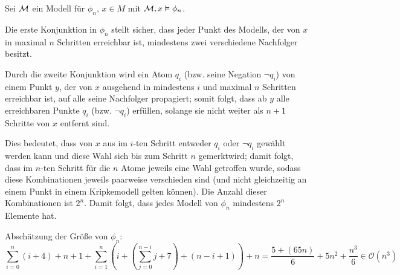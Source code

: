 
Sei $\mathcal{M}$ ein Modell für $\phi_n$, $x\in M$ mit $\mathcal{M}, x \vDash
\phi_n$.

Die erste Konjunktion in $\phi_n$ stellt sicher, dass jeder Punkt des
Modells, der von $x$ in maximal $n$ Schritten erreichbar ist, mindestens zwei
verschiedene Nachfolger besitzt.

Durch die zweite Konjunktion wird ein Atom $q_i$ (bzw. seine Negation $\neg q_i$)
von einem Punkt $y$, der von $x$ ausgehend in mindestens $i$ und maximal $n$
Schritten erreichbar ist, auf alle seine Nachfolger propagiert; somit folgt,
dass ab $y$ alle erreichbaren Punkte $q_i$ (bzw. $\neg q_i$) erfüllen,
solange sie nicht weiter als $n+1$ Schritte von $x$ entfernt sind.

Dies bedeutet, dass von $x$ aus im $i$-ten Schritt entweder $q_i$ oder $\neg
q_i$ gewählt werden kann und diese Wahl sich bis zum Schritt $n$ \glqq
gemerkt\grqq wird; damit folgt, dass im $n$-ten Schritt für die $n$ Atome
jeweils eine Wahl getroffen wurde, sodass diese Kombinationen jeweils paarweise
verschieden sind (und nicht gleichzeitig an einem Punkt in einem Kripkemodell
gelten können). Die Anzahl dieser Kombinationen ist $2^n$. Damit folgt, dass
jedes Modell von $\phi_n$ mindestens $2^n$ Elemente hat.

Abschätzung der Größe von $\phi_n$:
\[
\sum_{i=0}^{n}(i + 4) + n + 1 + \sum_{i=1}^{n}\left(i + \left(\sum_{j=0}^{n-i}
j + 7\right) + (n - i + 1) \right) + n = \frac{5+(65 n)}{6}+5 n^2+\frac{n^3}{6}
\in \mathcal{O}(n^3)
\]

